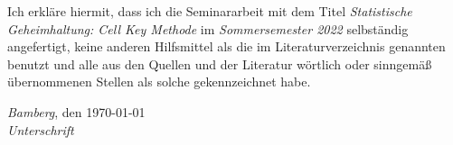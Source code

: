 
\noindent%
Ich erkläre hiermit, dass ich die Seminararbeit mit dem Titel \emph{Statistische Geheimhaltung: Cell Key Methode} im \emph{Sommersemester 2022} selbständig angefertigt, keine anderen Hilfsmittel als die im Literaturverzeichnis genannten benutzt und alle aus den Quellen und der Literatur wörtlich oder sinngemäß übernommenen Stellen als solche gekennzeichnet habe.%
\bigskip
 
\noindent%
\emph{Bamberg}, den \today\\%
\emph{Unterschrift}%

%

